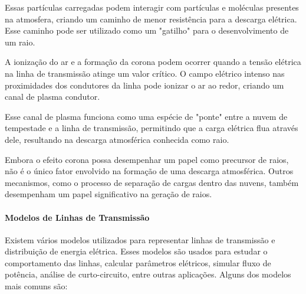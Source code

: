 \documentclass[a4paper, 12pt, onecolumn,singlespacing]{article}
\begin{document}
	Essas partículas carregadas podem interagir com partículas e moléculas presentes na atmosfera, criando um caminho de menor resistência para a descarga elétrica. Esse caminho pode ser utilizado como um "gatilho" para o desenvolvimento de um raio.
	
	A ionização do ar e a formação da corona podem ocorrer quando a tensão elétrica na linha de transmissão atinge um valor crítico. O campo elétrico intenso nas proximidades dos condutores da linha pode ionizar o ar ao redor, criando um canal de plasma condutor.
	
	Esse canal de plasma funciona como uma espécie de "ponte" entre a nuvem de tempestade e a linha de transmissão, permitindo que a carga elétrica flua através dele, resultando na descarga atmosférica conhecida como raio.
	
	Embora o efeito corona possa desempenhar um papel como precursor de raios, não é o único fator envolvido na formação de uma descarga atmosférica. Outros mecanismos, como o processo de separação de cargas dentro das nuvens, também desempenham um papel significativo na geração de raios.
	
	\paragraph{Modelos de Linhas de Transmissão}
	
	 Existem vários modelos utilizados para representar linhas de transmissão e distribuição de energia elétrica. Esses modelos são usados para estudar o comportamento das linhas, calcular parâmetros elétricos, simular fluxo de potência, análise de curto-circuito, entre outras aplicações. Alguns dos modelos mais comuns são:
	
\end{document}
